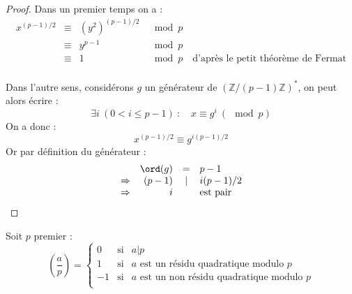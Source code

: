 \documentclass[a4paper, 10pt]{thesis}
\begin{document}

\begin{proof}
    Dans un premier temps on a :
    \begin{displaymath}
        \begin{array}{rcll}
            x^{(p-1) / 2} & \equiv & (y^2)^{(p-1) / 2} & \mod p \\
                          & \equiv & y^{p-1} & \mod p \\
                          & \equiv & 1 & \mod p \quad \mbox{d'après le petit théorème de Fermat}\\
        \end{array}
    \end{displaymath}

    Dans l'autre sens, considérons $g$ un générateur de $(\mathbb{Z}/(p-1)\mathbb{Z})^*$, on peut
    alors écrire : \begin{displaymath}
        \exists i \ (0 < i \leq p-1)\ : \quad x \equiv g^i\ (\mod p)
    \end{displaymath}
    On a donc : \begin{displaymath}
        x^{(p-1) / 2} \equiv g^{i(p-1)/2}
    \end{displaymath}
    Or par définition du générateur : \begin{displaymath}
        \begin{array}{rrcl}
            & \ord(g) & = & p-1 \\
            \Rightarrow & (p-1) & | & i(p-1)/2 \\
            \Rightarrow & i & & \mbox{est pair} \\
        \end{array}
    \end{displaymath}
\end{proof}

\begin{df}
    Soit $p$ premier : 
    \begin{displaymath}
        \left ( \frac{a}{p} \right ) = \left \lbrace \begin{array}{rcl}
            0 & \mbox{si} & a|p \\
            1 & \mbox{si} & a \mbox{ est un résidu quadratique modulo }p \\
            -1 & \mbox{si} & a \mbox{ est un non résidu quadratique modulo }p \\
        \end{array} \right .
    \end{displaymath}
\end{df}
\end{document}
